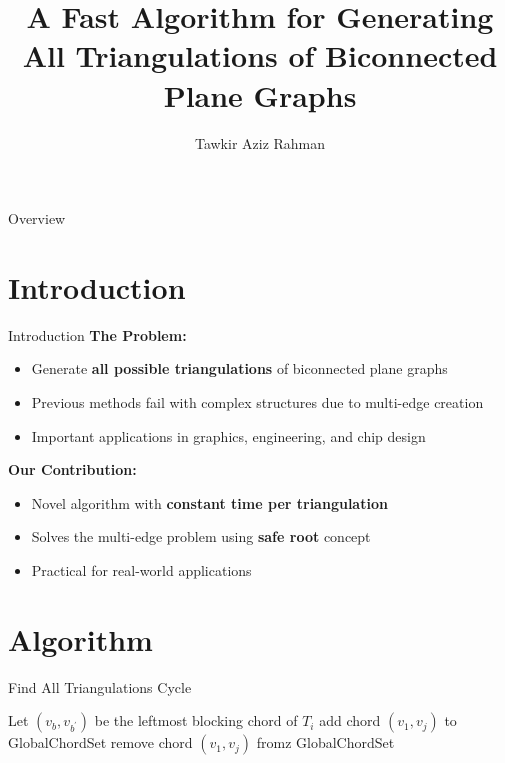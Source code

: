 \documentclass{beamer}
\title{A Fast Algorithm for Generating All Triangulations of Biconnected Plane Graphs}
\author{Tawkir Aziz Rahman}
\institute{CSE, BUET}
\date{}
\begin{document}
\begin{frame}
	\titlepage
\end{frame}

\begin{frame}{Overview}
	\tableofcontents
\end{frame}

\section{Introduction}
\begin{frame}{Introduction}
	\textbf{The Problem:}
	\begin{itemize}
		\item Generate \textbf{all possible triangulations} of biconnected plane graphs
		\item Previous methods fail with complex structures due to multi-edge creation
		\item Important applications in graphics, engineering, and chip design
	\end{itemize}

	\vspace{0.5cm}
	\textbf{Our Contribution:}
	\begin{itemize}
		\item Novel algorithm with \textbf{constant time per triangulation}
		\item Solves the multi-edge problem using \textbf{safe root} concept
		\item Practical for real-world applications
	\end{itemize}
\end{frame}

\section{Algorithm}



\begin{frame}{Find All Triangulations Cycle}
	\begin{algorithmic}[1]
		\State {}
		\State \Return
		\EndIf
		\State Let $(v_{b},v_{b^{\prime}})$ be the leftmost blocking chord of $T_i$
        \State add chord $(v_{1},v_{j})$ to GlobalChordSet
		\State {}
        \State remove chord $(v_{1},v_{j})$ fromz  GlobalChordSet
		\EndIf
		\EndFor
		\EndProcedure
	\end{algorithmic}
\end{frame}
\end{document}
